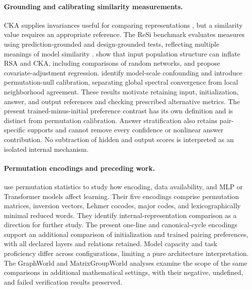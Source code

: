 \paragraph{Grounding and calibrating similarity measurements.}
CKA supplies invariances useful for comparing representations
\citep{kornblith2019}, but a similarity value requires an appropriate reference.
The ReSi benchmark evaluates measures using prediction-grounded and
design-grounded tests, reflecting multiple meanings of model similarity
\citep{klabunde2025resi}. \citet{cui2022deconfounded} show that input population
structure can inflate RSA and CKA, including comparisons of random networks,
and propose covariate-adjustment regression.
\citet{groger2026aristotelian} identify model-scale confounding and introduce
permutation-null calibration, separating global spectral convergence from
local neighborhood agreement. These results motivate retaining input,
initialization, answer, and output references and checking prescribed
alternative metrics. The present trained-minus-initial preference contrast has
its own definition and is distinct from permutation calibration. Answer
stratification also retains pair-specific supports and cannot remove every
confidence or nonlinear answer contribution. No subtraction of hidden and
output scores is interpreted as an isolated internal mechanism.

\paragraph{Permutation encodings and preceding work.}
\citet{scullen2025permutations} use permutation statistics to study how encoding,
data availability, and MLP or Transformer models affect learning. Their five
encodings comprise permutation matrices, inversion vectors, Lehmer cocodes,
major codes, and lexicographically minimal reduced words. They identify internal-representation comparison
as a direction for further study. The present one-line and canonical-cycle
encodings support an additional comparison of initialization and trained
pairing preferences, with all declared layers and relations retained. Model
capacity and task proficiency differ across configurations, limiting a pure
architecture interpretation. The GraphWorld and MatrixGroupWorld analyses
examine the scope of the same comparisons in additional mathematical settings,
with their negative, undefined, and failed verification results preserved.

\workshopplaceholder
